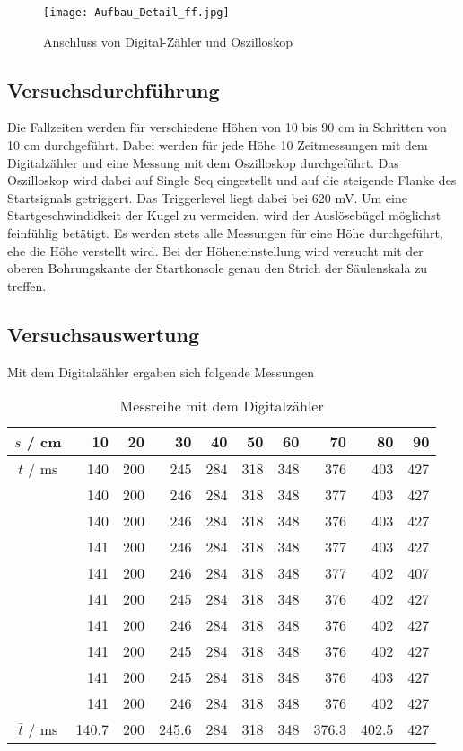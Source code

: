 \documentclass[a4paper, 12pt]{scrartcl}
\begin{document}
\begin{figure}[h]
	\centering
	\texttt{[image: Aufbau\_Detail\_ff.jpg]}
	\caption{Anschluss von Digital-Zähler und Oszilloskop}
\end{figure}



\subsection{Versuchsdurchführung}

Die Fallzeiten werden für verschiedene Höhen von 10 bis 90 cm in Schritten von 10 cm durchgeführt. Dabei werden für jede Höhe 10 Zeitmessungen mit dem Digitalzähler und eine Messung mit dem Oszilloskop durchgeführt. Das Oszilloskop wird dabei auf Single Seq eingestellt und auf die steigende Flanke des Startsignals getriggert. Das Triggerlevel liegt dabei bei 620 mV. Um eine Startgeschwindidkeit der Kugel zu vermeiden, wird der Auslösebügel möglichst feinfühlig betätigt. Es werden stets alle Messungen für eine Höhe durchgeführt, ehe die Höhe verstellt wird. Bei der Höheneinstellung wird versucht mit der oberen Bohrungskante der Startkonsole genau den Strich der Säulenskala zu treffen.


\subsection{Versuchsauswertung}

Mit dem Digitalzähler ergaben sich folgende Messungen
\begin{table}[h]
\begin{center}
\begin{tabular}{c|r|r|r|r|r|r|r|r|r}
$s$ / cm & 10 & 20 & 30 & 40 & 50 & 60 & 70 & 80 & 90 \\
\hline
$t$ / ms & 140 & 200 & 245 & 284 & 318 & 348 & 376 & 403 & 427 \\
         & 140 & 200 & 246 & 284 & 318 & 348 & 377 & 403 & 427 \\
	 & 140 & 200 & 246 & 284 & 318 & 348 & 376 & 403 & 427 \\
	 & 141 & 200 & 246 & 284 & 318 & 348 & 377 & 403 & 427 \\
	 & 141 & 200 & 246 & 284 & 318 & 348 & 377 & 402 & 407 \\
	 & 141 & 200 & 245 & 284 & 318 & 348 & 376 & 402 & 427 \\
	 & 141 & 200 & 246 & 284 & 318 & 348 & 376 & 402 & 427 \\
	 & 141 & 200 & 245 & 284 & 318 & 348 & 376 & 402 & 427 \\
	 & 141 & 200 & 245 & 284 & 318 & 348 & 376 & 403 & 427 \\
	 & 141 & 200 & 246 & 284 & 318 & 348 & 376 & 402 & 427 \\
\hline
$\bar t$ / ms & 140.7 & 200 & 245.6 & 284 & 318 & 348 & 376.3 & 402.5 & 427
\end{tabular}
\caption{Messreihe mit dem Digitalzähler}
\end{center}
\end{table}
\end{document}
